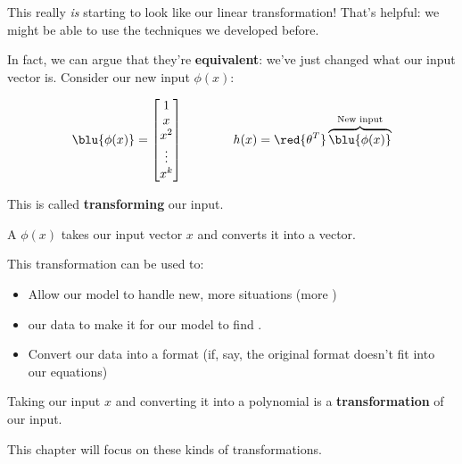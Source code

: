         This really \textit{is} starting to look like our linear transformation! That's helpful: we might be able to use the techniques we developed before.

        In fact, we can argue that they're \textbf{equivalent}: we've just changed what our input vector is. Consider our new input $\phi(x)$:

        \begin{equation}
            \blu{\phi(x)}
            = 
            \begin{bmatrix}
                1 \\ x \\ x^2 \\ \vdots \\ x^k
            \end{bmatrix}
            \qquad \qquad
            h(x) = 
            \red{\theta^T} 
            \overbrace{
            \blu{\phi(x)}
            }^{\text{New input}}
        \end{equation}
        
        This is called \textbf{transforming} our input.\\

        \begin{definition}
            A  $\phi(x)$ takes our input vector $x$ and converts it into a  vector.

            This transformation can be used to:

            \begin{itemize}
                \item Allow our model to handle new, more  situations (more )

                \item {} our data to make it  for our model to find .
                
                \item Convert our data into a  format (if, say, the original format doesn't fit into our equations)
                
            \end{itemize}
        \end{definition}

        \miniex Taking our input $x$ and converting it into a polynomial is a \textbf{transformation} of our input.

        This chapter will focus on these kinds of transformations. 

